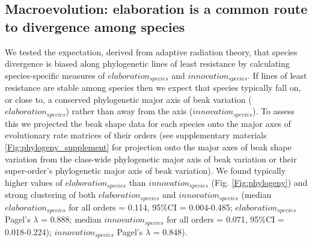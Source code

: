 \documentclass[12pt,letterpaper]{article}
\begin{document}
\subsection{Macroevolution: elaboration is a common route to divergence among species}
We tested the expectation, derived from adaptive radiation theory, that species divergence is biased along phylogenetic lines of least resistance by calculating species-specific measures of $elaboration_{species}$ and $innovation_{species}$.
If lines of least resistance are stable among species then we expect that species typically fall on, or close to, a conserved phylogenetic major axis of beak variation ($elaboration_{species}$) rather than away from the axis ($innovation_{species}$).
To assess this we projected the beak shape data for each species onto %
the major axes of evolutionary rate matrices of their orders (see supplementary materials \ref{Fig:phylogeny_supplement} for projection onto the major axes of beak shape variation from the class-wide phylogenetic major axis of beak variation or their super-order’s phylogenetic major axis of beak variation).
We found typically higher values of $elaboration_{species}$ than $innovation_{species}$ (Fig. \ref{Fig:phylogeny}) %
and strong clustering of both $elaboration_{species}$ and $innovation_{species}$ (median $elaboration_{species}$ for all orders = 0.114, 95\%CI = 0.004-0.485;  $elaboration_{species}$ Pagel's $\lambda$ = 0.888; median $innovation_{species}$ for all orders = 0.071, 95\%CI = 0.018-0.224); $innovation_{species}$ Pagel's $\lambda$ = 0.848).%
\end{document}
